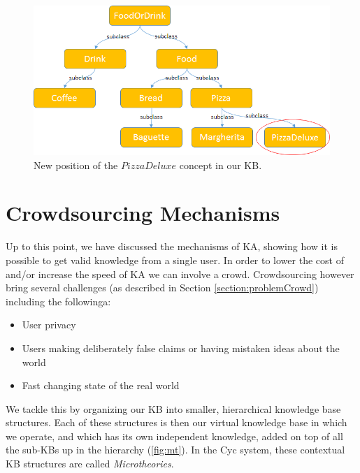 \begin{figure}[H]
	\centering
		\includegraphics[width=1\textwidth]{figures/kbCorrectPosition.png}
	\caption{New position of the $PizzaDeluxe$ concept in our KB.}
	\label{fig:kbCorrectPosition}
\end{figure}

\section{Crowdsourcing Mechanisms}
\label{section:crowdsourcing}
Up to this point, we have discussed the mechanisms of KA, showing how it is 
possible to get valid knowledge from a single user. In order to lower the cost 
of and/or increase the speed of KA we can involve a crowd. Crowdsourcing 
however bring several challenges (as described in Section 
\autoref{section:problemCrowd}) including the followinga:
\begin{itemize}
\item User privacy
\item Users making deliberately false claims or having mistaken ideas about the 
world
\item Fast changing state of the real world
\end{itemize}
We tackle this by organizing our KB into smaller, hierarchical knowledge base 
structures. Each of these structures is then our virtual knowledge base in 
which we operate, and which has its own independent knowledge, added on top of 
all the sub-KBs up in the hierarchy (\autoref{fig:mt}). In the Cyc system, these
contextual KB structures are called \emph{Microtheories}\parencite{Kleer2013}.

